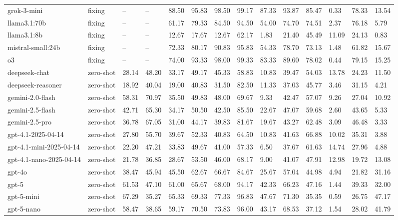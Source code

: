 \begin{table}[!t]
\begin{tabular}{llllllllllllll}
grok-3-mini & fixing & -- & -- & 88.50 & 95.83 & 98.50 & 99.17 & 87.33 & 93.87 & 85.47 & 0.33 & 78.33 & 13.54 \\
llama3.1:70b & fixing & -- & -- & 61.17 & 79.33 & 84.50 & 94.50 & 54.00 & 74.70 & 74.51 & 2.37 & 76.18 & 5.79 \\
llama3.1:8b & fixing & -- & -- & 12.67 & 17.67 & 12.67 & 62.17 & 1.83 & 21.40 & 45.49 & 11.09 & 24.13 & 0.83 \\
mistral-small:24b & fixing & -- & -- & 72.33 & 80.17 & 90.83 & 95.83 & 54.33 & 78.70 & 73.13 & 1.48 & 61.82 & 15.67 \\
o3 & fixing & -- & -- & 74.00 & 93.33 & 98.00 & 99.33 & 83.33 & 89.60 & 78.02 & 0.44 & 79.15 & 15.25 \\
deepseek-chat & zero-shot & 28.14 & 48.20 & 33.17 & 49.17 & 45.33 & 58.83 & 10.83 & 39.47 & 54.03 & 13.78 & 24.23 & 11.50 \\
deepseek-reasoner & zero-shot & 18.92 & 40.04 & 19.00 & 40.83 & 31.50 & 82.50 & 11.33 & 37.03 & 45.77 & 3.46 & 31.15 & 4.21 \\
gemini-2.0-flash & zero-shot & 58.31 & 70.97 & 35.50 & 49.83 & 48.00 & 69.67 & 9.33 & 42.47 & 57.07 & 9.26 & 27.04 & 10.92 \\
gemini-2.5-flash & zero-shot & 42.71 & 65.30 & 34.17 & 50.50 & 42.50 & 85.50 & 22.67 & 47.07 & 59.68 & 2.60 & 43.65 & 5.33 \\
gemini-2.5-pro & zero-shot & 36.78 & 67.05 & 31.00 & 44.17 & 39.83 & 81.67 & 19.67 & 43.27 & 62.48 & 3.09 & 46.48 & 3.33 \\
gpt-4.1-2025-04-14 & zero-shot & 27.80 & 55.70 & 39.67 & 52.33 & 40.83 & 64.50 & 10.83 & 41.63 & 66.88 & 10.02 & 35.31 & 3.88 \\
gpt-4.1-mini-2025-04-14 & zero-shot & 22.20 & 47.21 & 33.83 & 49.67 & 41.00 & 57.33 & 6.50 & 37.67 & 61.63 & 14.74 & 27.96 & 4.88 \\
gpt-4.1-nano-2025-04-14 & zero-shot & 21.78 & 36.85 & 28.67 & 53.50 & 46.00 & 68.17 & 9.00 & 41.07 & 47.91 & 12.98 & 19.72 & 13.08 \\
gpt-4o & zero-shot & 38.47 & 45.94 & 45.50 & 62.67 & 66.67 & 84.67 & 25.67 & 57.04 & 44.98 & 4.94 & 21.82 & 31.16 \\
gpt-5 & zero-shot & 61.53 & 47.10 & 61.00 & 65.67 & 68.00 & 94.17 & 42.33 & 66.23 & 47.16 & 1.44 & 39.33 & 32.00 \\
gpt-5-mini & zero-shot & 67.29 & 35.27 & 65.33 & 69.33 & 77.33 & 96.83 & 47.67 & 71.30 & 35.35 & 0.59 & 26.75 & 47.17 \\
gpt-5-nano & zero-shot & 58.47 & 38.65 & 59.17 & 70.50 & 73.83 & 96.00 & 43.17 & 68.53 & 37.12 & 1.54 & 28.02 & 41.79 \\

\end{tabular}
\end{table}
